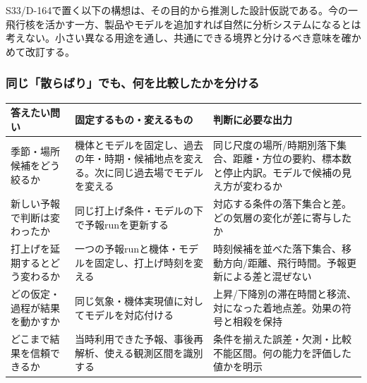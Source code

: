 \documentclass[11pt,a4paper]{article}
\newcounter{none}
\begin{document}
S33/D-164で置く以下の構想は、その目的から推測した設計仮説である。今の一飛行核を活かす一方、製品やモデルを追加すれば自然に分析システムになるとは考えない。小さい異なる用途を通し、共通にできる境界と分けるべき意味を確かめて改訂する。

\subsubsection{同じ「散らばり」でも、何を比較したかを分ける}\label{ux540cux3058ux6563ux3089ux3070ux308aux3067ux3082ux4f55ux3092ux6bd4ux8f03ux3057ux305fux304bux3092ux5206ux3051ux308b}

{\def\LTcaptype{none} %
\begin{longtable}[]{@{}
  >{\raggedright\arraybackslash}p{}
  >{\raggedright\arraybackslash}p{}
  >{\raggedright\arraybackslash}p{}@{}}
\toprule\noalign{}
\begin{minipage}[b]{\linewidth}\raggedright
答えたい問い
\end{minipage} & \begin{minipage}[b]{\linewidth}\raggedright
固定するもの・変えるもの
\end{minipage} & \begin{minipage}[b]{\linewidth}\raggedright
判断に必要な出力
\end{minipage} \\
\midrule\noalign{}
\endhead
\bottomrule\noalign{}
\endlastfoot
季節・場所候補をどう絞るか &
機体とモデルを固定し、過去の年・時期・候補地点を変える。次に同じ過去場でモデルを変える
&
同じ尺度の場所/時期別落下集合、距離・方位の要約、標本数と停止内訳。モデルで候補の見え方が変わるか \\
新しい予報で判断は変わったか &
同じ打上げ条件・モデルの下で予報runを更新する &
対応する条件の落下集合と差。どの気層の変化が差に寄与したか \\
打上げを延期するとどう変わるか &
一つの予報runと機体・モデルを固定し、打上げ時刻を変える &
時刻候補を並べた落下集合、移動方向/距離、飛行時間。予報更新による差と混ぜない \\
どの仮定・過程が結果を動かすか &
同じ気象・機体実現値に対してモデルを対応付ける &
上昇/下降別の滞在時間と移流、対になった着地点差。効果の符号と相殺を保持 \\
どこまで結果を信頼できるか &
当時利用できた予報、事後再解析、使える観測区間を識別する &
条件を揃えた誤差・欠測・比較不能区間。何の能力を評価した値かを明示 \\
\end{longtable}
}
\end{document}
